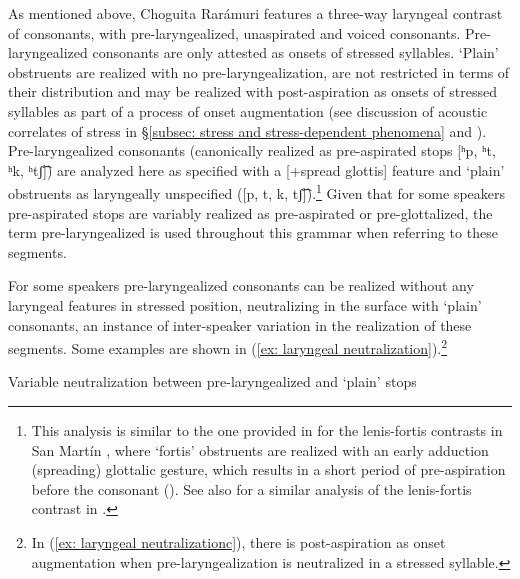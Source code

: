 As mentioned above, Choguita Rarámuri features a three-way laryngeal contrast of consonants, with pre-laryngealized, unaspirated and voiced consonants. Pre-laryngealized consonants are only attested as onsets of stressed syllables. ‘Plain’ obstruents are realized with no pre-laryngealization, are not restricted in terms of their distribution and may be realized with post-aspiration as onsets of stressed syllables as part of a process of onset augmentation (see discussion of acoustic correlates of stress in §\ref{subsec: stress and stress-dependent phenomena} and \citealt{caballero2015tone}). Pre-laryngealized consonants (canonically realized as pre-aspirated stops [ʰp, ʰt, ʰk, ʰtʃ͡]) are analyzed here as specified with a [+spread glottis] feature and `plain' obstruents as laryngeally unspecified ([p, t, k, tʃ͡]).\footnote{This analysis is similar to the one provided in \citet{dicanio2012phonetics} for the lenis-fortis contrasts in San Martín , where `fortis' obstruents are realized with an early adduction (spreading) glottalic gesture, which results in a short period of pre-aspiration before the consonant (\citeyear[257]{dicanio2012phonetics}). See also \citet{arellanes2009sistema} for a similar analysis of the lenis-fortis contrast in .} Given that for some speakers pre-aspirated stops are variably realized as pre-aspirated or pre-glottalized, the term pre-laryngealized is used throughout this grammar when referring to these segments.

For some speakers pre-laryngealized consonants can be realized without any laryngeal features in stressed position, neutralizing in the surface with ‘plain’ consonants, an instance of inter-speaker variation in the realization of these segments. Some examples are shown in (\ref{ex: laryngeal neutralization}).\footnote{In (\ref{ex: laryngeal neutralizationc}), there is post-aspiration as onset augmentation when pre-laryngealization is neutralized in a stressed syllable.}

\ea\label{ex: laryngeal neutralization}
{Variable neutralization between pre-laryngealized and `plain' stops}

